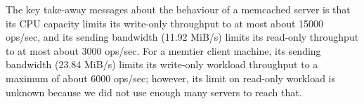 
The key take-away messages about the behaviour of a memcached server is that its CPU capacity limits its write-only throughput to at most about 15000 ops/sec, and its sending bandwidth (11.92 MiB/s) limits its read-only throughput to at most about 3000 ops/sec. For a memtier client machine, its sending bandwidth (23.84 MiB/s) limits its write-only workload throughput to a maximum of about 6000 ops/sec; however, its limit on read-only workload is unknown because we did not use enough many servers to reach that.